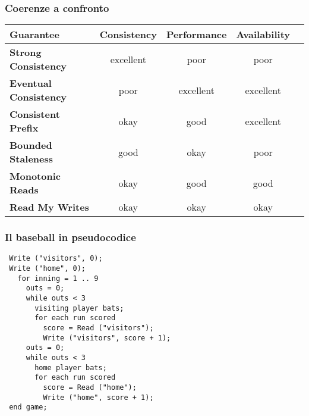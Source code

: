 \begin{frame}
\frametitle{Coerenze a confronto}
  \begin{center}
  \begin{tabular}{l*{3}{c}r}
\textbf{Guarantee}     & \textbf{Consistency} & \textbf{Performance} & \textbf{Availability} \\
\hline
\textbf{Strong Consistency}     & excellent & poor & poor   \\
\textbf{Eventual Consistency}   & poor & excellent & excellent \\
\textbf{Consistent Prefix}      & okay & good & excellent\\
\textbf{Bounded Staleness}      & good & okay & poor     \\
\textbf{Monotonic Reads}        & okay & good & good     \\
\textbf{Read My Writes}         & okay & okay & okay     \\
\end{tabular}
  \end{center}
\end{frame}


\begin{frame}[fragile]
\frametitle{Il baseball in pseudocodice}
\begin{lstlisting}
 Write ("visitors", 0);
 Write ("home", 0);
   for inning = 1 .. 9
     outs = 0;
     while outs < 3
       visiting player bats;
       for each run scored
         score = Read ("visitors");
         Write ("visitors", score + 1);
     outs = 0;
     while outs < 3
       home player bats;
       for each run scored
         score = Read ("home");
         Write ("home", score + 1);
 end game;
\end{lstlisting}
\end{frame}

